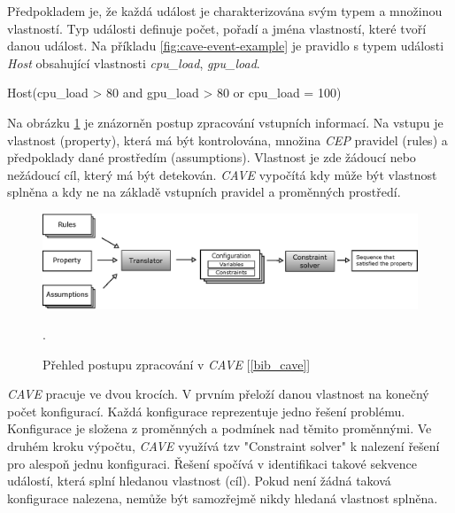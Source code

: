 \documentclass[
  digital, %
  table,   %
  nolof,     %
  nolot,     %
  oneside, %
  nocover,
  monochrome,
  12pt
]{fithesis3}
\begin{document}
Předpokladem je, že každá událost je charakterizována svým typem a množinou vlastností. Typ události definuje počet, pořadí a jména vlastností, které tvoří danou událost. Na příkladu \ref{fig:cave-event-example} je pravidlo s typem události \textit{Host} obsahující vlastnosti \textit{cpu\_load}, \textit{gpu\_load}.

\begin{center}
\begin{minipage}[H]{.97\linewidth}
	\begin{mylisting}
Host(cpu_load > 80 and gpu_load > 80 or cpu_load = 100)
	\end{mylisting}
	\label{fig:cave-event-example} 
\end{minipage}
\end{center}

Na obrázku \ref{fig:cave-concept} je znázorněn postup zpracování vstupních informací. Na vstupu je vlastnost (property), která má být kontrolována, množina \textit{CEP} pravidel (rules) a předpoklady dané prostředím (assumptions). Vlastnost je zde žádoucí nebo nežádoucí cíl, který má být detekován. \textit{CAVE} vypočítá kdy může být vlastnost splněna a kdy ne na základě vstupních pravidel a proměnných prostředí. 

\begin{figure}[H]
	\centering
    \includegraphics[width=\textwidth, height=0.2\textheight]{images/cave-concept.eps}
    \caption{Přehled postupu zpracování v \textit{CAVE} [\ref{bib_cave}]}.
    \label{fig:cave-concept}
\end{figure}

\textit{CAVE} pracuje ve dvou krocích. V prvním přeloží danou vlastnost na konečný počet konfigurací. Každá konfigurace reprezentuje jedno řešení problému. Konfigurace je složena z proměnných a podmínek nad těmito proměnnými. Ve druhém kroku výpočtu, \textit{CAVE} využívá tzv "Constraint solver" k nalezení řešení pro alespoň jednu konfiguraci. Řešení spočívá v identifikaci takové sekvence událostí, která splní hledanou vlastnost (cíl). Pokud není žádná taková konfigurace nalezena, nemůže být samozřejmě nikdy hledaná vlastnost splněna.
\end{document}
